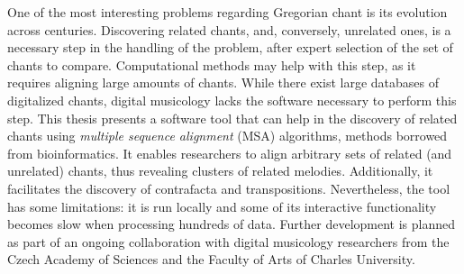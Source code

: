 \documentclass[12pt]{report}
\begin{document}

One of the most interesting problems regarding Gregorian chant is its evolution across centuries.
Discovering related chants, and, conversely, unrelated ones, is a necessary step in the handling of the problem, after expert selection of the set of chants to compare.
Computational methods may help with this step, as it requires aligning large amounts of chants.
While there exist large databases of digitalized chants, digital musicology lacks the software necessary to perform this step.
This thesis presents a software tool that can help in the discovery of related chants using \emph{multiple sequence alignment} (MSA) algorithms, methods borrowed from bioinformatics.
It enables researchers to align arbitrary sets of related (and unrelated) chants, thus revealing clusters of related melodies.
Additionally, it facilitates the discovery of contrafacta and transpositions. 
Nevertheless, the tool has some limitations: it is run locally and some of its interactive functionality becomes slow when processing hundreds of data.
Further development is planned as part of an ongoing collaboration with digital musicology researchers from the Czech Academy of Sciences and the Faculty of Arts of Charles University.
\end{document}
